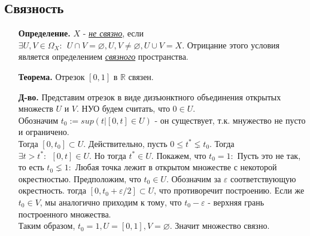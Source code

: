 \documentclass[10pt]{report}
\begin{document}
\begin{spacing}{1.5}
\section{Связность}
\begin{enumerate}
\item[\textbf{Определение.}] $X$ - \emph{\underline{не связно}}, если $\exists U, V\in\Omega_{X}:~~U\cap V=\varnothing, U, V\neq \varnothing, U\cup V=X$. Отрицание этого условия является определением \emph{\underline{связного}} пространства.
\item[\textbf{Теорема.}] Отрезок $[0, 1]$ в $\mathbb{R}$ связен.
\item[\textbf{Д-во.}] Представим отрезок в виде дизъюнктного объединения открытых множеств $U$ и $V$. НУО будем считать, что $0\in U$.\\
Обозначим $t_{0}:=sup(t|[0, t]\in U)$ - он существует, т.к. мнужество не пусто и ограничено.\\
Тогда $[0, t_{0}]\subset U$. Действительно, пусть $0\leq t^{*}\lneq t_{0}$. Тогда $\exists t>t^{*}:~~ [0, t]\in U.$ Но тогда $t^{*}\in U.$
Покажем, что $t_{0}=1:$ Пусть это не так, то есть $t_{0}\lneq 1:$  Любая точка лежит в открытом множестве с некоторой окрестностью. Предположим, что $t_{0}\in U$. Обозначим за $\varepsilon$ соответствующую окрестность. тогда $[0, t_{0}+\varepsilon/2]\subset U$, что противоречит построению. Если же $t_{0}\in V$, мы аналогично приходим к тому, что $t_{0}-\varepsilon$ - верхняя грань построенного множества. 
\\ Таким образом, $t_{0}=1, U=[0, 1], V=\varnothing.$ Значит множество связно.
\end{enumerate}







 \end{spacing}
 
\end{document}
